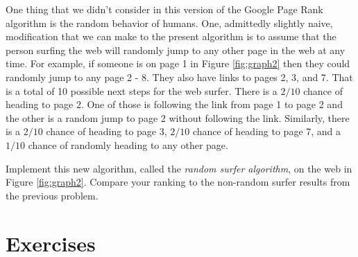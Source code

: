 \begin{problem}
    One thing that we didn't consider in this version of the Google Page Rank algorithm is
    the random behavior of humans.  One, admittedly slightly naive, modification that we
    can make to the present algorithm is to assume that the person surfing the web will
    randomly jump to any other page in the web at any time.  For example, if someone is on
    page 1 in Figure \ref{fig:graph2} then they could randomly jump to any page 2 - 8.
    They also have links to pages 2, 3, and 7.  That is a total of 10 possible next steps
    for the web surfer.  There is a $2/10$ chance of heading to page 2.  One of those is
    following the link from page 1 to page 2 and the other is a random jump to page 2
    without following the link.  Similarly, there is a $2/10$ chance of
    heading to page 3, $2/10$ chance of heading to page 7, and a $1/10$ chance of randomly
    heading to any other page.

    Implement this new algorithm, called the {\it random surfer algorithm}, on the web in
    Figure \ref{fig:graph2}.  Compare your ranking to the non-random surfer results from
    the previous problem.
\end{problem}




\newpage\section{Exercises}

